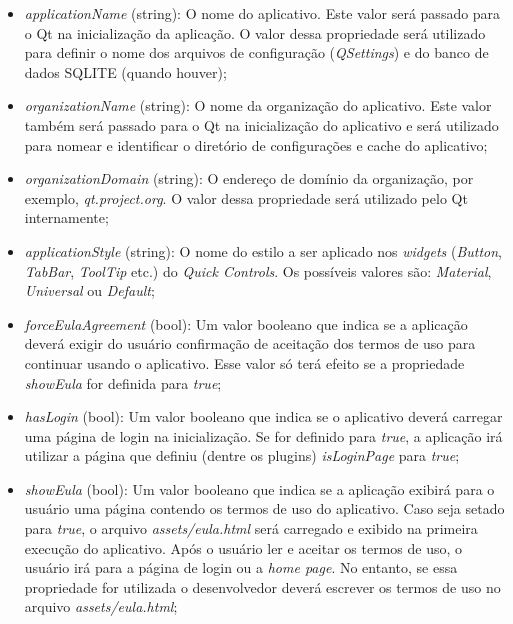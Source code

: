 \begin{itemize}
	\item \textit{applicationName} (string): O nome do aplicativo. Este valor será passado para o Qt na inicialização da aplicação. O valor dessa propriedade será utilizado para definir o nome dos arquivos de configuração (\textit{QSettings}) e do banco de dados SQLITE (quando houver);

	\item \textit{organizationName} (string): O nome da organização do aplicativo. Este valor também será passado para o Qt na inicialização do aplicativo e será utilizado para nomear e identificar o diretório de configurações e cache do aplicativo;

	\item \textit{organizationDomain} (string): O endereço de domínio da organização, por exemplo, \textit{qt.project.org}. O valor dessa propriedade será utilizado pelo Qt internamente;

	\item \textit{applicationStyle} (string): O nome do estilo a ser aplicado nos \textit{widgets} (\textit{Button}, \textit{TabBar}, \textit{ToolTip} etc.) do \textit{Quick Controls}. Os possíveis valores são: \textit{Material}, \textit{Universal} ou \textit{Default};

	\item \textit{forceEulaAgreement} (bool): Um valor booleano que indica se a aplicação deverá exigir do usuário confirmação de aceitação dos termos de uso para continuar usando o aplicativo. Esse valor só terá efeito se a propriedade \textit{showEula} for definida para \textit{true};

	\item \textit{hasLogin} (bool): Um valor booleano que indica se o aplicativo deverá carregar uma página de login na inicialização. Se for definido para \textit{true}, a aplicação irá utilizar a página que definiu (dentre os plugins) \textit{isLoginPage} para \textit{true};

	\item \textit{showEula} (bool): Um valor booleano que indica se a aplicação exibirá para o usuário uma página contendo os termos de uso do aplicativo. Caso seja setado para \textit{true}, o arquivo \textit{assets/eula.html} será carregado e exibido na primeira execução do aplicativo. Após o usuário ler e aceitar os termos de uso, o usuário irá para a página de login ou a \textit{home page}. No entanto, se essa propriedade for utilizada o desenvolvedor deverá escrever os termos de uso no arquivo \textit{assets/eula.html};


\end{itemize}
